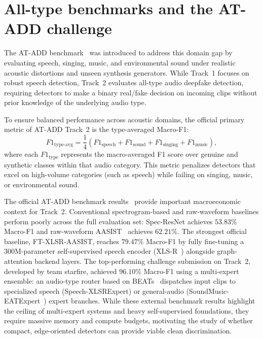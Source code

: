 \documentclass[12pt,a4paper]{report}
\begin{document}
\section{All-type benchmarks and the AT-ADD challenge}

The AT-ADD benchmark~\cite{xie2026atadd} was introduced to address this domain gap by evaluating speech, singing, music, and environmental sound under realistic acoustic distortions and unseen synthesis generators. While Track~1 focuses on robust speech detection, Track~2 evaluates all-type audio deepfake detection, requiring detectors to make a binary real/fake decision on incoming clips without prior knowledge of the underlying audio type.

To ensure balanced performance across acoustic domains, the official primary metric of AT-ADD Track~2 is the type-averaged Macro-F1:
\begin{equation}
F1_{\mathrm{type\text{-}avg}} = \frac{1}{4}\left(F1_{\mathrm{speech}} + F1_{\mathrm{sound}} + F1_{\mathrm{singing}} + F1_{\mathrm{music}}\right),
\end{equation}
where each $F1_{\mathrm{type}}$ represents the macro-averaged F1 score over genuine and synthetic classes within that audio category. This metric penalizes detectors that excel on high-volume categories (such as speech) while failing on singing, music, or environmental sound.

The official AT-ADD benchmark results~\cite{xie2026atadd} provide important macroeconomic context for Track~2. Conventional spectrogram-based and raw-waveform baselines perform poorly across the full evaluation set: Spec-ResNet achieves $53.83\%$ Macro-F1 and raw-waveform AASIST~\cite{jung2022aasist} achieves $62.21\%$. The strongest official baseline, FT-XLSR-AASIST, reaches $79.47\%$ Macro-F1 by fully fine-tuning a 300M-parameter self-supervised speech encoder (XLS-R~\cite{babu2021xlsr}) alongside graph-attention backend layers. The top-performing challenge submission on Track~2, developed by team starfire, achieved $96.10\%$ Macro-F1 using a multi-expert ensemble: an audio-type router based on BEATs~\cite{chen2022beats} dispatches input clips to specialized speech (Speech-XLSRExpert) or general-audio (SoundMusic-EATExpert~\cite{chen2024eat}) expert branches. While these external benchmark results highlight the ceiling of multi-expert systems and heavy self-supervised foundations, they require massive memory and compute budgets, motivating the study of whether compact, edge-oriented detectors can provide viable clean discrimination.
\end{document}
